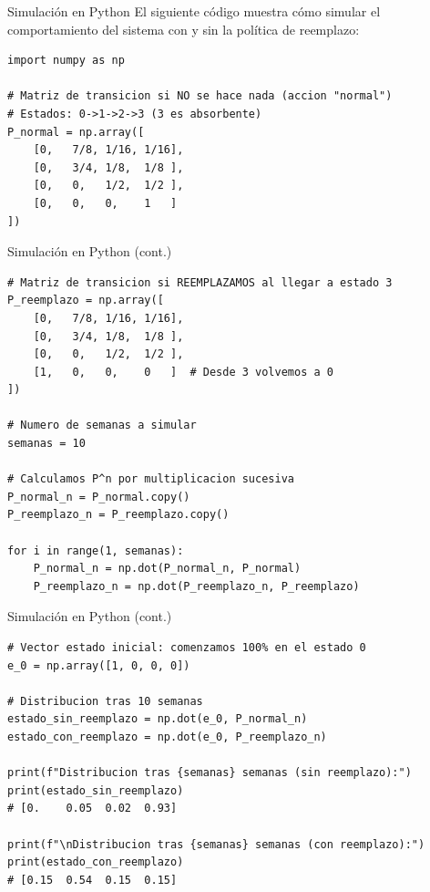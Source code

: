 \documentclass{beamer}
\begin{document}
\begin{frame}[fragile]{Simulación en Python}
    \small
    El siguiente código muestra cómo simular el comportamiento del sistema con y sin la política de reemplazo:

    \vspace{0.5em}

    \begin{lstlisting}
import numpy as np

# Matriz de transicion si NO se hace nada (accion "normal")
# Estados: 0->1->2->3 (3 es absorbente)
P_normal = np.array([
    [0,   7/8, 1/16, 1/16],
    [0,   3/4, 1/8,  1/8 ],
    [0,   0,   1/2,  1/2 ],
    [0,   0,   0,    1   ]
])
    \end{lstlisting}
\end{frame}

\begin{frame}[fragile]{Simulación en Python (cont.)}
    \small
    \begin{lstlisting}
# Matriz de transicion si REEMPLAZAMOS al llegar a estado 3
P_reemplazo = np.array([
    [0,   7/8, 1/16, 1/16],
    [0,   3/4, 1/8,  1/8 ],
    [0,   0,   1/2,  1/2 ],
    [1,   0,   0,    0   ]  # Desde 3 volvemos a 0
])

# Numero de semanas a simular
semanas = 10

# Calculamos P^n por multiplicacion sucesiva
P_normal_n = P_normal.copy()
P_reemplazo_n = P_reemplazo.copy()

for i in range(1, semanas):
    P_normal_n = np.dot(P_normal_n, P_normal)
    P_reemplazo_n = np.dot(P_reemplazo_n, P_reemplazo)
    \end{lstlisting}
\end{frame}

\begin{frame}[fragile]{Simulación en Python (cont.)}
    \small
    \begin{lstlisting}
# Vector estado inicial: comenzamos 100% en el estado 0
e_0 = np.array([1, 0, 0, 0])

# Distribucion tras 10 semanas
estado_sin_reemplazo = np.dot(e_0, P_normal_n)
estado_con_reemplazo = np.dot(e_0, P_reemplazo_n)

print(f"Distribucion tras {semanas} semanas (sin reemplazo):")
print(estado_sin_reemplazo)
# [0.    0.05  0.02  0.93]

print(f"\nDistribucion tras {semanas} semanas (con reemplazo):")
print(estado_con_reemplazo)
# [0.15  0.54  0.15  0.15]
    \end{lstlisting}
\end{frame}
\end{document}
